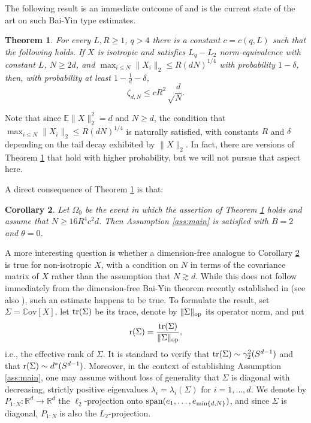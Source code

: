 \documentclass[11pt]{amsart}
\newcommand{\R}{\mathbb{R}}
\newtheorem{theorem}{Theorem}[section]
\newtheorem{corollary}[theorem]{Corollary}
\theoremstyle{definition}
\newcommand{\E}{\mathbb{E}}
\newcommand{\C}{\mathrm{\mathbb{C}ov}}
\numberwithin{equation}{section}
\begin{document}
The  following result is an immediate outcome of  \cite[Corollary 2]{tikhomirov2018sample} and  is the current state of the art on such Bai-Yin type estimates.

\begin{theorem}
\label{thm:Bai.Yin}
For every $L,R\geq 1$, $q>4$ there is a constant $c=c(q,L)$ such that the following holds.
If $X$ is isotropic and satisfies $L_{q}-L_{2}$ norm-equivalence with constant $L$,  $N\geq 2d$, and  $\max_{i\leq N} \|X_{i}\|_{2} \leq R (dN)^{1/4}$ with probability $1-\delta$, then, with probability at least $1-\frac{1}{d}-\delta$, 
\[\zeta_{d,N}\leq cR^2  \sqrt\frac{d}{N}.\]
\end{theorem}

Note that since $\E\|X\|_{2}^{2} =  d$ and $N\geq d$, the condition that $\max_{i\leq N }  \|X_i\|_2\leq R(dN)^{1/4}$ is naturally satisfied, with constants $R$ and $\delta$ depending on the tail decay exhibited by $\|X\|_2$.
In fact, there are versions of Theorem \ref{thm:Bai.Yin} that hold with higher probability, but we will not pursue that aspect here.

A direct consequence of Theorem \ref{thm:Bai.Yin} is that:

\begin{corollary}
\label{cor:Bai.Yin}
	Let $\Omega_{0}$ be the event in which the assertion of Theorem \ref{thm:Bai.Yin} holds  and assume that  $  N\geq  16R^4c^2 d $.
	Then Assumption \ref{ass:main} is satisfied with $B=2$ and $\theta=0$.
\end{corollary}

A more interesting question is whether a dimension-free analogue to Corollary \ref{cor:Bai.Yin} is true for non-isotropic $X$, with a condition on $N$ in terms of the covariance matrix of $X$ rather than the assumption that $N\gtrsim d$.
While this does not follow immediately from the dimension-free Bai-Yin theorem recently established in \cite{abdalla2022covariance} (see also \cite{jirak2025concentration}), such an estimate happens to be true.
To  formulate the result, set $\Sigma=\C[X]$, let ${\rm tr}(\Sigma)$ be  its trace, denote by $\|\Sigma\|_{\rm op}$ its operator norm, and put
\[ {\rm r}(\Sigma) = \frac{ {\rm tr}(\Sigma)}{\|\Sigma\|_{\rm op}},\]
i.e., the effective rank of $\Sigma$.
It is standard to verify that  ${\rm tr}(\Sigma) \sim \gamma_2^2(S^{d-1})$ and  that  ${\rm r}(\Sigma)\sim d^\ast(S^{d-1})$.
Moreover, in the context of establishing Assumption \ref{ass:main},  one may assume without loss of generality that $\Sigma$ is diagonal with decreasing, strictly positive eigenvalues $\lambda_i =\lambda_i(\Sigma)$ for $i=1,\dots,d$.
We denote by $P_{1:N}\colon\R^{d}\to\R^{d}$ the $\ell_2$-projection onto ${\rm span}(e_1,\dots,e_{\min\{d,N\}})$, and since $\Sigma$ is diagonal, $P_{1:N}$ is also the $L_2$-projection.
\end{document}
